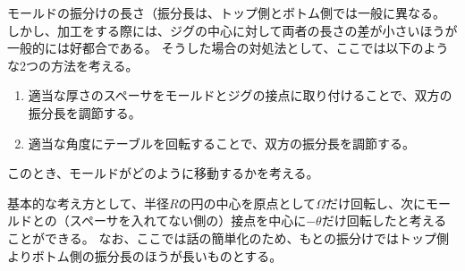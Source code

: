 


モールドの振分けの長さ（振分長は、トップ側とボトム側では一般に異なる。
しかし、加工をする際には、ジグの中心に対して両者の長さの差が小さいほうが一般的には好都合である。
そうした場合の対処法として、ここでは以下のような2つの方法を考える。
\begin{enumerate}
\item
適当な厚さのスペーサをモールドとジグの接点に取り付けることで、双方の振分長を調節する。
\item
適当な角度にテーブルを回転することで、双方の振分長を調節する。
\end{enumerate}
このとき、モールドがどのように移動するかを考える。

基本的な考え方として、半径$R$の円の中心を原点として$\Omega$だけ回転し、次にモールドとの（スペーサを入れてない側の）接点を中心に$-\theta$だけ回転したと考えることができる。
なお、ここでは話の簡単化のため、もとの振分けではトップ側よりボトム側の振分長のほうが長いものとする。




